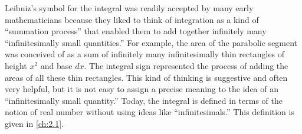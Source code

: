 \begin{note}
  Leibniz's symbol for the integral was readily accepted by many early mathematicians because they liked to think of integration as a kind of ``summation process'' that enabled them to add together infinitely many ``infinitesimally small quantities.''
  For example, the area of the parabolic segment was conceived of as a sum of infinitely many infinitesimally thin rectangles of height \(x^2\) and base \(dx\).
  The integral sign represented the process of adding the areas of all these thin rectangles.
  This kind of thinking is suggestive and often very helpful, but it is not easy to assign a precise meaning to the idea of an ``infinitesimally small quantity.''
  Today, the integral is defined in terms of the notion of real number without using ideas like ``infinitesimals.''
  This definition is given in \cref{ch:2.1}.
\end{note}
